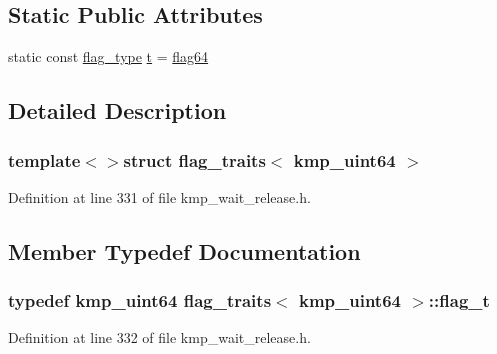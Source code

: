 \subsection*{Static Public Attributes}
\begin{DoxyCompactItemize}
\item 
static const \hyperlink{group__WAIT__RELEASE_ga507a7197646f995b5529a68c1481e39b}{flag\-\_\-type} \hyperlink{structflag__traits_3_01kmp__uint64_01_4_a0fdaf5c8a6127d85abd0b226f923feed}{t} = \hyperlink{group__WAIT__RELEASE_gga507a7197646f995b5529a68c1481e39ba8b02d824728fb546d43123b8b069ed04}{flag64}
\end{DoxyCompactItemize}


\subsection{Detailed Description}
\subsubsection*{template$<$$>$struct flag\-\_\-traits$<$ kmp\-\_\-uint64 $>$}



Definition at line 331 of file kmp\-\_\-wait\-\_\-release.\-h.



\subsection{Member Typedef Documentation}
\hypertarget{structflag__traits_3_01kmp__uint64_01_4_a1cd5c1b0bf5f69b71ca924315e7320c2}{
\subsubsection[{flag\-\_\-t}]{\setlength{\rightskip}{0pt plus 5cm}typedef kmp\-\_\-uint64 {\bf flag\-\_\-traits}$<$ kmp\-\_\-uint64 $>$\-::{\bf flag\-\_\-t}}}\label{structflag__traits_3_01kmp__uint64_01_4_a1cd5c1b0bf5f69b71ca924315e7320c2}


Definition at line 332 of file kmp\-\_\-wait\-\_\-release.\-h.



